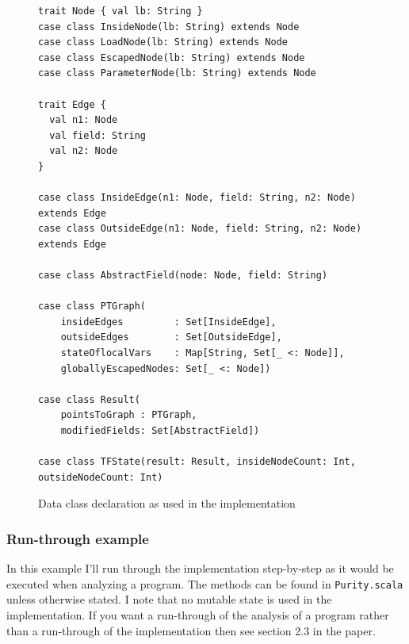\documentclass[11pt]{exam}
\begin{document}
\begin{figure}[t]
\begin{lstlisting}
trait Node { val lb: String }
case class InsideNode(lb: String) extends Node
case class LoadNode(lb: String) extends Node
case class EscapedNode(lb: String) extends Node
case class ParameterNode(lb: String) extends Node

trait Edge {
  val n1: Node
  val field: String
  val n2: Node
}

case class InsideEdge(n1: Node, field: String, n2: Node) extends Edge
case class OutsideEdge(n1: Node, field: String, n2: Node) extends Edge

case class AbstractField(node: Node, field: String)

case class PTGraph(
    insideEdges         : Set[InsideEdge],
    outsideEdges        : Set[OutsideEdge],
    stateOflocalVars    : Map[String, Set[_ <: Node]],
    globallyEscapedNodes: Set[_ <: Node])

case class Result(
    pointsToGraph : PTGraph,
    modifiedFields: Set[AbstractField])

case class TFState(result: Result, insideNodeCount: Int, outsideNodeCount: Int)
\end{lstlisting}
\caption{Data class declaration as used in the implementation}
\label{code-data}
\end{figure}

\subsubsection*{Run-through example}

In this example I'll run through the implementation step-by-step as it
would be executed when analyzing a program. The methods can be found
in \texttt{Purity.scala} unless otherwise stated. I note that no mutable
state is used in the implementation. If you want a run-through of the
analysis of a program rather than a run-through of the implementation then
see section 2.3 in the paper. \newline
\end{document}
